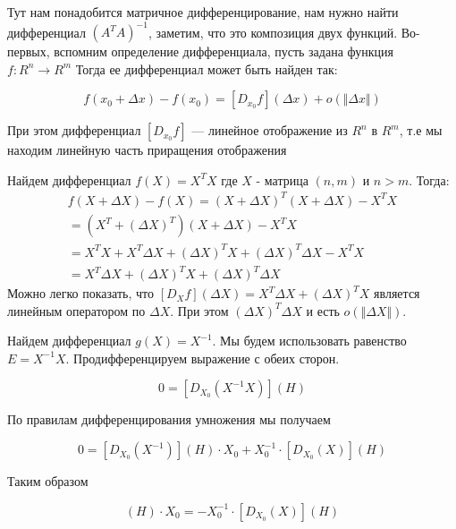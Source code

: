 \documentclass{article}
\begin{document}
    Тут нам понадобится матричное дифференцирование, нам нужно найти дифференциал $(A^T A)^{-1}$, заметим, что это композиция двух функций.
    Во-первых, вспомним определение дифференциала, пусть задана функция $f: R^{n} \rightarrow R^{m}$
    Тогда ее дифференциал может быть найден так:

    \begin{equation}
        f(x_{0} + \Delta x) - f(x_{0}) = [D_{x_{0}} f](\Delta x) + o(\Vert \Delta x \Vert)
    \end{equation}

    При этом дифференциал $[D_{x_{0}} f]$ --- линейное отображение из $R^{n}$ в $R^{m}$, т.е мы находим линейную часть приращения отображения

    \quad

    Найдем дифференциал $f(X) = X^{T} X$ где $X$ - матрица $(n, m)$ и $n > m$.
    Тогда:
    \[
    \begin{gathered}
        f(X + \Delta X) - f(X) = (X + \Delta X)^{T} (X + \Delta X) - X^{T} X \\
        = (X^{T} + (\Delta X)^{T}) (X + \Delta X) - X^{T} X \\
        = X^{T} X + X^{T} \Delta X + (\Delta X)^{T} X + (\Delta X)^{T} \Delta X - X^{T} X \\
        = X^{T} \Delta X + (\Delta X)^{T} X + (\Delta X)^{T} \Delta X
    \end{gathered}
    \]
    Можно легко показать, что $[D_{X} f](\Delta X) = X^{T} \Delta X + (\Delta X)^{T} X$ является линейным оператором по $\Delta X$.
    При этом $(\Delta X)^{T} \Delta X$ и есть $o(\Vert \Delta X \Vert)$.

    \quad

    Найдем дифференциал $g(X) = X^{-1}$.
    Мы будем использовать равенство $E = X^{-1} X$.
    Продифференцируем выражение с обеих сторон.

    \begin{equation}
        0 = [D_{X_{0}} (X^{-1} X)](H)
    \end{equation}

    По правилам дифференцирования умножения мы получаем

    \begin{equation}
        0 = [D_{X_{0}} (X^{-1})](H) \cdot X_{0} + X_{0}^{-1} \cdot [D_{X_{0}} (X)](H)
    \end{equation}

    Таким образом

    \begin{equation}
        [D_{X_{0}} (X^{-1})](H) \cdot X_{0} = - X_{0}^{-1} \cdot [D_{X_{0}} (X)](H)
    \end{equation}
\end{document}
